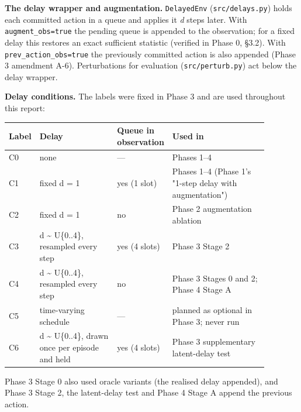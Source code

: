 \documentclass[11pt]{article}
\begin{document}
\textbf{The delay wrapper and augmentation.} \texttt{DelayedEnv} (\texttt{src/delays.py}) holds each committed action in a queue and applies it \emph{d} steps later. With \texttt{augment\_\allowbreak{}obs=true} the pending queue is appended to the observation; for a fixed delay this restores an exact sufficient statistic (verified in Phase 0, \S{}3.2). With \texttt{prev\_\allowbreak{}action\_\allowbreak{}obs=true} the previously committed action is also appended (Phase 3 amendment A-6). Perturbations for evaluation (\texttt{src/\allowbreak{}perturb.\allowbreak{}py}) act below the delay wrapper.



\textbf{Delay conditions.} The labels were fixed in Phase 3 and are used throughout this report:



\begin{center}\small\begin{tabular}{>{\raggedright\arraybackslash}p{0.057\linewidth}>{\raggedright\arraybackslash}p{0.303\linewidth}>{\raggedright\arraybackslash}p{0.139\linewidth}>{\raggedright\arraybackslash}p{0.379\linewidth}}
\toprule
Label & Delay & Queue in observation & Used in \\
\midrule
C0 & none & --- & Phases 1--4 \\
C1 & fixed d = 1 & yes (1 slot) & Phases 1--4 (Phase 1's "1-step delay with augmentation") \\
C2 & fixed d = 1 & no & Phase 2 augmentation ablation \\
C3 & d \textasciitilde{} U\{0..4\}, resampled every step & yes (4 slots) & Phase 3 Stage 2 \\
C4 & d \textasciitilde{} U\{0..4\}, resampled every step & no & Phase 3 Stages 0 and 2; Phase 4 Stage A \\
C5 & time-varying schedule & --- & planned as optional in Phase 3; never run \\
C6 & d \textasciitilde{} U\{0..4\}, drawn once per episode and held & yes (4 slots) & Phase 3 supplementary latent-delay test \\
\bottomrule
\end{tabular}\end{center}



Phase 3 Stage 0 also used oracle variants (the realised delay appended), and Phase 3 Stage 2, the latent-delay test and Phase 4 Stage A append the previous action.
\end{document}
